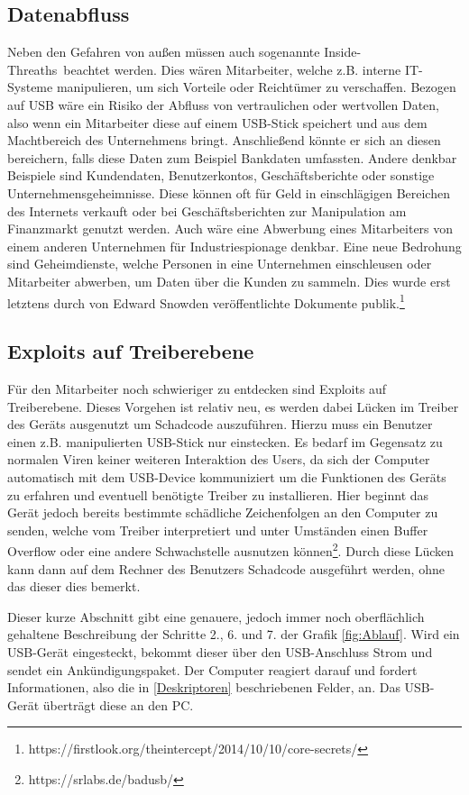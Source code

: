 \subsection{Datenabfluss}
Neben den Gefahren von außen müssen auch sogenannte \glqq Inside-Threaths\grqq \ beachtet werden. Dies wären Mitarbeiter, welche z.B. interne IT-Systeme manipulieren, um sich Vorteile oder Reichtümer zu verschaffen. Bezogen auf USB wäre ein Risiko der Abfluss von vertraulichen oder wertvollen Daten, also wenn ein Mitarbeiter diese auf einem USB-Stick speichert und aus dem Machtbereich des Unternehmens bringt. Anschließend könnte er sich an diesen bereichern, falls diese Daten zum Beispiel Bankdaten umfassten. Andere denkbar Beispiele sind Kundendaten, Benutzerkontos, Geschäftsberichte oder sonstige Unternehmensgeheimnisse. Diese können oft für Geld in einschlägigen Bereichen des Internets verkauft oder bei Geschäftsberichten zur Manipulation am Finanzmarkt genutzt werden. Auch wäre eine Abwerbung eines Mitarbeiters von einem anderen Unternehmen für Industriespionage denkbar.
Eine neue Bedrohung sind Geheimdienste, welche Personen in eine Unternehmen einschleusen oder Mitarbeiter abwerben, um Daten über die Kunden zu sammeln. Dies wurde erst letztens durch von Edward Snowden veröffentlichte Dokumente publik.\footnote{https://firstlook.org/theintercept/2014/10/10/core-secrets/}

\subsection{Exploits auf Treiberebene}
Für den Mitarbeiter noch schwieriger zu entdecken sind Exploits auf Treiberebene. Dieses Vorgehen ist relativ neu, es werden dabei Lücken im Treiber des Geräts ausgenutzt um Schadcode auszuführen. Hierzu muss ein Benutzer einen z.B. manipulierten USB-Stick nur einstecken. Es bedarf im Gegensatz zu normalen Viren keiner weiteren Interaktion des Users, da sich der Computer automatisch mit dem USB-Device kommuniziert um die Funktionen des Geräts zu erfahren und eventuell benötigte Treiber zu installieren. Hier beginnt das Gerät jedoch bereits bestimmte schädliche Zeichenfolgen an den  Computer zu senden, welche vom Treiber interpretiert und unter Umständen einen Buffer Overflow  oder eine andere Schwachstelle ausnutzen können\footnote{https://srlabs.de/badusb/}. Durch diese Lücken kann dann auf dem Rechner des Benutzers Schadcode ausgeführt werden, ohne das dieser dies bemerkt.

Dieser kurze Abschnitt gibt eine genauere, jedoch immer noch oberflächlich gehaltene Beschreibung der Schritte 2., 6. und 7. der Grafik \ref{fig:Ablauf}. Wird ein USB-Gerät eingesteckt, bekommt dieser über den USB-Anschluss Strom und sendet ein Ankündigungspaket. Der Computer reagiert darauf und fordert Informationen, also die in \ref{Deskriptoren} beschriebenen Felder, an. Das USB-Gerät überträgt diese an den PC. \cite{USBDesk}

